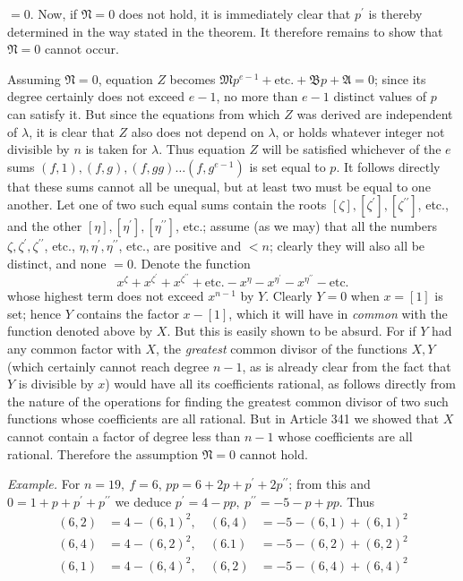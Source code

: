 \(=0\). Now, if \(\mathfrak N=0\) does not hold, it is immediately clear that \(p^{\prime}\) is thereby determined in the way stated in the
theorem. It therefore remains to show that \(\mathfrak N=0\) cannot occur.

Assuming \(\mathfrak N=0\), equation \(Z\) becomes \(\mathfrak Mp^{e-1}+\text{etc.}+\mathfrak Bp+\mathfrak A=0\); since its degree certainly does not exceed \(e-1\), no more than \(e-1\) distinct values of \(p\) can satisfy it. But since the equations from which \(Z\) was derived are independent of \(\lambda\), it is clear that \(Z\) also does not depend on \(\lambda\), or holds whatever integer not divisible by \(n\) is taken for \(\lambda\). Thus equation \(Z\) will be satisfied whichever of the \(e\) sums \((f,\allowbreak 1),\allowbreak (f,\allowbreak g),\allowbreak (f,\allowbreak gg)\ldots(f,\allowbreak g^{e-1})\) is set equal to \(p\). It follows directly that these sums cannot all be unequal, but at least two must be equal to one another. Let one of two such equal sums contain the roots \([\zeta],\allowbreak [\zeta^{\prime}],\allowbreak [\zeta^{\prime\prime}]\), etc., and the other \([\eta],\allowbreak [\eta^{\prime}],\allowbreak [\eta^{\prime\prime}]\), etc.; assume (as we may) that all the numbers \(\zeta,\allowbreak \zeta^{\prime},\allowbreak \zeta^{\prime\prime}\), etc., \(\eta,\allowbreak \eta^{\prime},\allowbreak \eta^{\prime\prime}\), etc., are positive and \(<n\); clearly they will also all be distinct, and none \(=0\). Denote the function \[x^\zeta+x^{\zeta^{\prime}}+x^{\zeta^{\prime\prime}}+\text{etc.}-x^\eta-x^{\eta^{\prime}}-x^{\eta^{\prime\prime}}-\text{etc.}\] whose highest term does not exceed \(x^{n-1}\) by \(Y\). Clearly \(Y=0\) when \(x=[1]\) is set; hence \(Y\) contains the factor \(x-[1]\), which it will have in \textit{common} with the function denoted above by \(X\). But this is easily shown to be absurd. For if \(Y\) had any common factor with \(X\), the \textit{greatest} common divisor of the functions \(X,\allowbreak Y\) (which certainly cannot reach degree \(n-1\), as is already clear from the fact that \(Y\) is divisible by \(x\)) would have all its coefficients rational, as follows directly from the nature of the operations for finding the greatest common divisor of two such functions whose coefficients are all rational. But in Article 341 we showed that \(X\) cannot contain a factor of degree less than \(n-1\) whose coefficients are all rational. Therefore the assumption \(\mathfrak N=0\) cannot hold.

\textit{Example.} For \(n=19,\allowbreak \ f=6\), \(pp=6+2p+p^{\prime}+2p^{\prime\prime}\); from this and \(0=1+p+p^{\prime}+p^{\prime\prime}\) we deduce \(p^{\prime}=4-pp,\allowbreak \ p^{\prime\prime}=-5-p+pp\). Thus \[\begin{aligned}(6,2)&=4-(6,1)^2,\ &(6,4)&=-5-(6,1)+(6,1)^2\\(6,\allowbreak 4)&=4-(6,\allowbreak 2)^2,\allowbreak \ &(6.1)&=-5-(6,\allowbreak 2)+(6,\allowbreak 2)^2\\(6,\allowbreak 1)&=4-(6,\allowbreak 4)^2,\allowbreak \ &(6,\allowbreak 2)&=-5-(6,\allowbreak 4)+(6,\allowbreak 4)^2\end{aligned}\]


